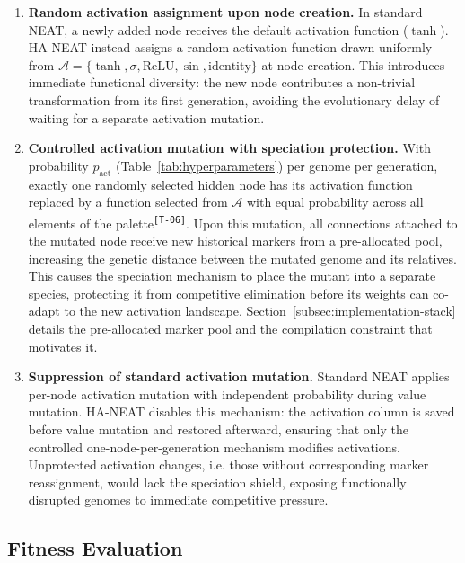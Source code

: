 \documentclass[12pt]{article}
\newcommand{\revID}[1]{\textsuperscript{\scriptsize\texttt{[#1]}}}
\newcommand{\revTerm}[2]{\textcolor{lrTeal}{#2}\revID{#1}}      %
\begin{document}
\begin{enumerate}
    \item \textbf{Random activation assignment upon node creation.} In standard NEAT, a newly added node receives the default activation function ($\tanh$). HA-NEAT instead assigns a random activation function drawn uniformly from $\mathcal{A} = \{\tanh, \sigma, \text{ReLU}, \sin, \text{identity}\}$ at node creation. This introduces immediate functional diversity: the new node contributes a non-trivial transformation from its first generation, avoiding the evolutionary delay of waiting for a separate activation mutation.
    
    \item \textbf{Controlled activation mutation with speciation protection.} With probability $p_{\text{act}}$ (Table~\ref{tab:hyperparameters}) per genome per generation, exactly one randomly selected hidden node has its activation function replaced by a function selected from
    $\mathcal{A}$ with equal probability \revTerm{T-06}{across all elements of the palette}. Upon this mutation, all connections attached to the mutated node receive new historical markers from a pre-allocated pool, increasing the genetic distance between the mutated genome and its relatives. This causes the speciation mechanism to place the mutant into a separate species, protecting it from competitive elimination before its weights can co-adapt to the new activation landscape. Section~\ref{subsec:implementation-stack} details the pre-allocated marker pool and the compilation constraint that motivates it.
    
    \item \textbf{Suppression of standard activation mutation.} Standard NEAT applies per-node activation mutation with independent probability during value mutation. HA-NEAT disables this mechanism: the activation column is saved before value mutation and restored afterward, ensuring that only the controlled one-node-per-generation mechanism modifies activations. Unprotected activation changes, i.e. those without corresponding marker reassignment, would lack the speciation shield, exposing functionally disrupted genomes to immediate competitive pressure.
\end{enumerate}


\subsection{Fitness Evaluation}
\label{subsec:fitness-evaluation}
\end{document}
